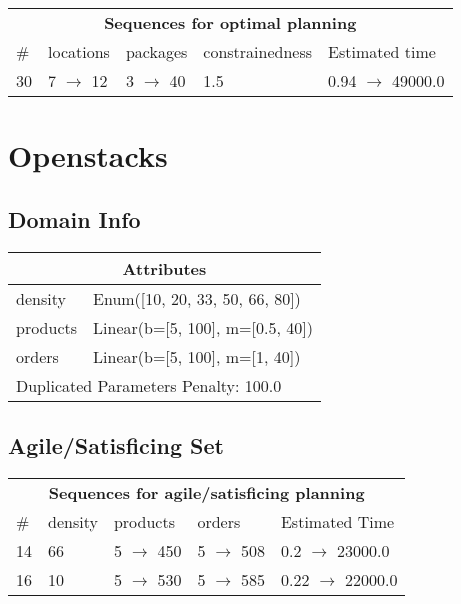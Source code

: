 \documentclass{article}
\begin{document}
                            \begin{center}
                            \begin{tabular}{l|l|l|l|l}
                            \multicolumn{5}{c}{\bf \large Sequences for optimal planning}\\
                            \# & locations & packages & constrainedness & Estimated time\\\midrule
                            30&7 $\rightarrow$ 12&3 $\rightarrow$ 40&1.5&0.94 $\rightarrow$ 49000.0
                            \end{tabular}
                            \end{center}
                    \newpage \section{Openstacks}
                    \subsection*{Domain Info}

                    \begin{center}
                    \begin{tabular}{p{}p{}}
                    \multicolumn{2}{c}{\bf \large Attributes}\\\midrule
                    density & Enum([10, 20, 33, 50, 66, 80])\\
products & Linear(b=[5, 100], m=[0.5, 40])\\
orders & Linear(b=[5, 100], m=[1, 40])
                    
                     \\\midrule
                    \multicolumn{2}{l}{Duplicated Parameters Penalty: 100.0}
                    \end{tabular}
                    \end{center}
                
                         \subsection*{Agile/Satisficing Set}

                        \begin{center}
                        \begin{tabular}{l|l|l|l|l}
                        \multicolumn{5}{c}{\bf \large Sequences for agile/satisficing planning}\\
                        \# & density & products & orders & Estimated Time\\\midrule
                        14&66&5 $\rightarrow$ 450&5 $\rightarrow$ 508&0.2 $\rightarrow$ 23000.0\\
16&10&5 $\rightarrow$ 530&5 $\rightarrow$ 585&0.22 $\rightarrow$ 22000.0
                        \end{tabular}
                        \end{center}
                    
\end{document}
